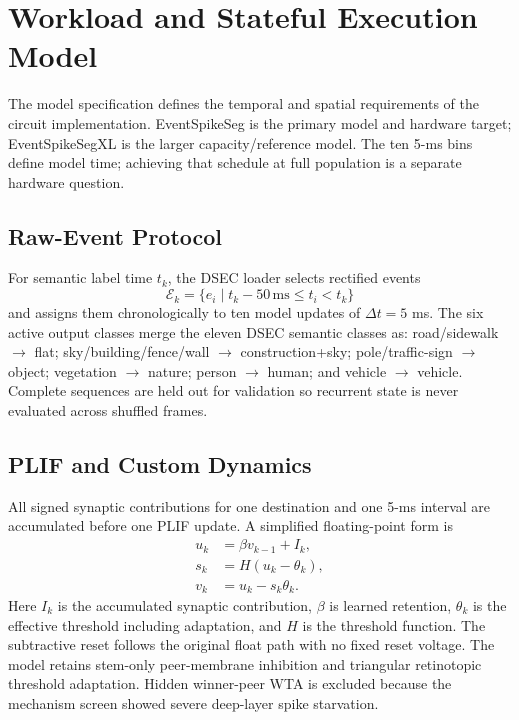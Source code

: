 \documentclass[preprint,12pt,number]{elsarticle}
\begin{document}
\section{Workload and Stateful Execution Model}
\label{sec:model}

The model specification defines the temporal and spatial requirements of the circuit implementation. EventSpikeSeg is the primary model and hardware target; EventSpikeSegXL is the larger capacity/reference model. The ten 5-ms bins define model time; achieving that schedule at full population is a separate hardware question.

\subsection{Raw-Event Protocol}
For semantic label time $t_k$, the DSEC loader selects rectified events
\begin{equation}
\mathcal{E}_k=\{e_i\mid t_k-50\,\mathrm{ms}\le t_i<t_k\}
\end{equation}
and assigns them chronologically to ten model updates of $\Delta t=5$ ms. The six active output classes merge the eleven DSEC semantic classes as: road/sidewalk $\rightarrow$ flat; sky/building/fence/wall $\rightarrow$ construction+sky; pole/traffic-sign $\rightarrow$ object; vegetation $\rightarrow$ nature; person $\rightarrow$ human; and vehicle $\rightarrow$ vehicle. Complete sequences are held out for validation so recurrent state is never evaluated across shuffled frames.

\subsection{PLIF and Custom Dynamics}
All signed synaptic contributions for one destination and one 5-ms interval are accumulated before one PLIF update. A simplified floating-point form is
\begin{align}
 u_k &= \beta v_{k-1}+I_k,\\
 s_k &= H(u_k-\theta_k),\\
 v_k &= u_k-s_k\theta_k.
\end{align}
Here $I_k$ is the accumulated synaptic contribution, $\beta$ is learned retention, $\theta_k$ is the effective threshold including adaptation, and $H$ is the threshold function. The subtractive reset follows the original float path with no fixed reset voltage. The model retains stem-only peer-membrane inhibition and triangular retinotopic threshold adaptation. Hidden winner-peer WTA is excluded because the mechanism screen showed severe deep-layer spike starvation.
\end{document}
